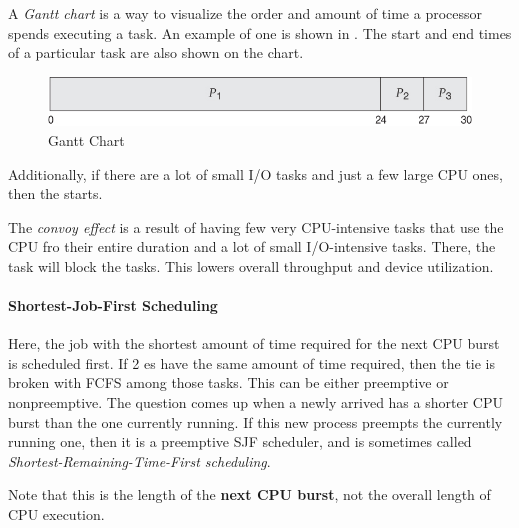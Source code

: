 \begin{definition}\label{def:Gantt_Chart}
  A \emph{Gantt chart} is a way to visualize the order and amount of time a processor spends executing a task.
  An example of one is shown in .
  The start and end times of a particular task are also shown on the chart.
\end{definition}

\begin{figure}[h!tbp]
  \centering
  \includegraphics[scale=0.8]{./Drawings/EDAF35-Operating_Systems/Gantt_Chart.jpg}
  \caption{Gantt Chart}
  \label{fig:Gantt_Chart}
\end{figure}

Additionally, if there are a lot of small I/O tasks and just a few large CPU ones, then the  starts.

\begin{definition}\label{def:Convoy_Effect}
  The \emph{convoy effect} is a result of having few very CPU-intensive tasks that use the CPU fro their entire duration and a lot of small I/O-intensive tasks.
  There, the  task will block the  tasks.
  This lowers overall throughput and device utilization.
\end{definition}

\paragraph{Shortest-Job-First Scheduling}\label{par:SJF_Scheduling}
Here, the job with the shortest amount of time required for the next CPU burst is scheduled first.
If 2 es have the same amount of time required, then the tie is broken with FCFS among those tasks.
This can be either preemptive or nonpreemptive.
The question comes up when a newly arrived  has a shorter CPU burst than the one currently running.
If this new process preempts the currently running one, then it is a preemptive SJF scheduler, and is sometimes called \emph{Shortest-Remaining-Time-First scheduling}.

\begin{blackbox}
  Note that this is the length of the \textbf{next CPU burst}, not the overall length of CPU execution.
\end{blackbox}

